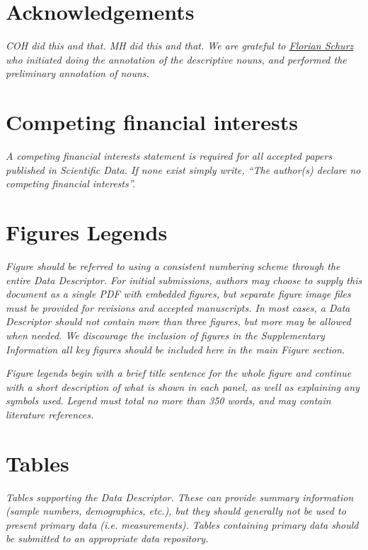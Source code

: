 \documentclass[english]{article}
\begin{document}
\section*{Acknowledgements}
\emph{COH did this and that.
MH did this and that.
We are grateful to \href{www.florianschurz.de}{Florian Schurz} who initiated doing the annotation of the descriptive nouns, and performed the preliminary annotation of nouns.}

\section*{Competing financial interests}
\emph{A competing financial interests statement is required for all accepted
papers published in \emph{Scientific Data}. If none exist simply write,
``The author(s) declare no competing financial interests''.}

\section*{Figures Legends}
\emph{Figure should be referred to using a consistent numbering scheme through
the entire Data Descriptor. For initial submissions, authors may choose
to supply this document as a single PDF with embedded figures, but
separate figure image files must be provided for revisions and accepted
manuscripts. In most cases, a Data Descriptor should not contain more
than three figures, but more may be allowed when needed. We discourage
the inclusion of figures in the Supplementary Information \textendash{}
all key figures should be included here in the main Figure section.}

\emph{Figure legends begin with a brief title sentence for the whole figure
and continue with a short description of what is shown in each panel,
as well as explaining any symbols used. Legend must total no more
than 350 words, and may contain literature references.}

\section*{Tables}

\emph{Tables supporting the Data Descriptor. These can provide summary information
(sample numbers, demographics, etc.), but they should generally not
be used to present primary data (i.e. measurements). Tables containing
primary data should be submitted to an appropriate data repository.}
\end{document}
